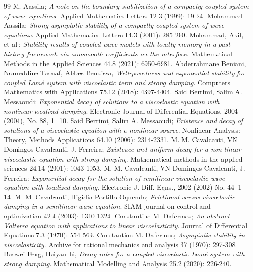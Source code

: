 \documentclass[10pt,a4paper]{amsart}
\numberwithin{equation}{section}
\begin{document}
\begin{thebibliography}{99}
 M. Aassila; \emph{A note on the boundary stabilization of a compactly coupled system of wave equations}. Applied Mathematics Letters 12.3 (1999): 19-24.
 Mohammed Aassila; \emph{Strong asymptotic stability of a compactly coupled system of wave equations}. Applied Mathematics Letters 14.3 (2001): 285-290.
 Mohammad, Akil, et al.; \emph{Stability results of coupled wave models with locally memory in a past history framework via nonsmooth coefficients on the interface}. Mathematical Methods in the Applied Sciences 44.8 (2021): 6950-6981.
 Abderrahmane Beniani,  Noureddine Taouaf,  Abbes Benaissa; \emph{Well-posedness and exponential stability for coupled Lam\'e system with viscoelastic term and strong damping}. Computers Mathematics with Applications 75.12 (2018): 4397-4404.
 Said Berrimi, Salim A. Messaoudi; \emph{Exponential decay of solutions to a viscoelastic equation with nonlinear localized damping}. Electronic Journal of Differential Equations, 2004 (2004), No. 88, 1=10.
 Said Berrimi, Salim A. Messaoudi; \emph{Existence and decay of solutions of a viscoelastic equation with a nonlinear source}. Nonlinear Analysis: Theory, Methods Applications 64.10 (2006): 2314-2331.
 M. M. Cavalcanti, VN Domingos Cavalcanti, J. Ferreira; \emph{Existence and uniform decay for a non-linear viscoelastic equation with strong damping}. Mathematical methods in the applied sciences 24.14 (2001): 1043-1053.
 M. M. Cavalcanti, VN Domingos Cavalcanti, J. Ferreira; \emph{Exponential decay for the solution of semilinear viscoelastic wave equation with localized damping}. Electronic J. Diff. Eqns., 2002 (2002) No. 44, 1-14.
 M. M. Cavalcanti, Higidio Portillo Oquendo; \emph{Frictional versus viscoelastic damping in a semilinear wave equation}. SIAM journal on control and optimization 42.4 (2003): 1310-1324.
 Constantine M. Dafermos; \emph{An abstract Volterra equation with applications to linear viscoelasticity}. Journal of Differential Equations 7.3 (1970): 554-569.
 Constantine M. Dafermos; \emph{Asymptotic stability in viscoelasticity}. Archive for rational mechanics and analysis 37 (1970): 297-308.
 Baowei Feng, Haiyan Li; \emph{Decay rates for a coupled viscoelastic Lam\'e system with strong damping}. Mathematical Modelling and Analysis 25.2 (2020): 226-240.

\end{thebibliography}
\end{document}
